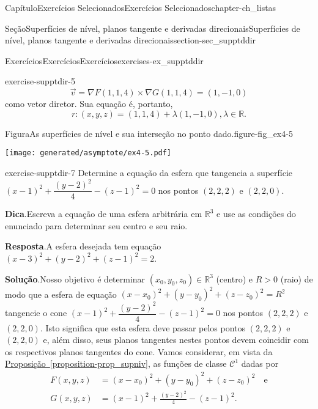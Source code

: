 \documentclass[oneside,10pt,]{book}
\newcommand{\blocktitlefont}{\relax}
\newcommand{\xreffont}{\relax}
\numberwithin{equation}{section}
\newcommand{\R}{\mathbb R}
\begin{document}
\begin{chapterptx}{Capítulo}{Exercícios Selecionados}{}{Exercícios Selecionados}{}{}{chapter-ch_listas}
\begin{sectionptx}{Seção}{Superfícies de nível, planos tangente e derivadas direcionais}{}{Superfícies de nível, planos tangente e derivadas direcionais}{}{}{section-sec_supptddir}
\begin{exercises-subsection-numberless}{Exercícios}{Exercícios}{}{Exercícios}{}{}{exercises-ex_supptddir}
\begin{divisionexercise}{5}{}{}{exercise-supptdir-5}
\begin{equation*}
\vec{v}=\nabla F(1,1,4) \times
\nabla G(1,1,4) = (1,-1,0)
\end{equation*}
como vetor diretor. Sua equação é, portanto,%
\begin{equation*}
r\colon (x,y,z) = (1,1,4) + \lambda (1,-1,0),
\lambda \in \mathbb{R}.
\end{equation*}
\begin{figureptx}{Figura}{As superfícies de nível e sua interseção no ponto dado.}{figure-fig_ex4-5}{}%
\begin{image}{0.25}{0.5}{0.25}{}%
\texttt{[image: generated/asymptote/ex4-5.pdf]}
\end{image}%
\tcblower
\end{figureptx}%
%
\end{divisionexercise}%
\begin{divisionexercise}{7}{}{}{exercise-supptdir-7}%
Determine a equação da esfera que tangencia a superfície \((x-1)^2 + \dfrac{(y-2)^2}{4} - (z-1)^2 =0\) nos pontos \((2,2,2)\) e \((2,2,0)\).%
\par\smallskip%
\noindent\textbf{\blocktitlefont Dica}.\hypertarget{hint-supptdir-7-b}{}\quad{}Escreva a equação de uma esfera arbitrária em \(\R^3\) e use as condições do enunciado para determinar seu centro e seu raio.%
\par\smallskip%
\noindent\textbf{\blocktitlefont Resposta}.\hypertarget{answer-supptdir-7-c}{}\quad{}A esfera desejada tem equação \((x-3)^2 + (y-2)^2 + (z-1)^2
= 2\).%
\par\smallskip%
\noindent\textbf{\blocktitlefont Solução}.\hypertarget{solution-supptdir-7-d}{}\quad{}Nosso objetivo é determinar \((x_0,y_0,z_0) \in \R^3\) (centro) e \(R>0\) (raio) de modo que a esfera de equação \((x-x_0)^2 + (y-y_0)^2 + (z-z_0)^2 = R^2\) tangencie o cone \((x-1)^2 + \dfrac{(y-2)^2}{4} - (z-1)^2 =0\) nos pontos \((2,2,2)\) e \((2,2,0)\). Isto significa que esta esfera deve passar pelos pontos \((2,2,2)\) e \((2,2,0)\) e, além disso, seus planos tangentes nestes pontos devem coincidir com os respectivos planos tangentes do cone. Vamos considerar, em vista da \hyperref[proposition-prop_supniv]{Proposição~{\xreffont\ref{proposition-prop_supniv}}}, as funções de classe \(\mathscr{C}^1\) dadas por%
\begin{align*}
F(x,y,z)& = (x-x_0)^2 + (y-y_0)^2 + (z-z_0)^2\quad\text{e}\\
G(x,y,z)& = (x-1)^2 + \frac{(y-2)^2}{4} -
(z-1)^2.
\end{align*}

\end{divisionexercise}
\end{exercises-subsection-numberless}
\end{sectionptx}
\end{chapterptx}
\end{document}
